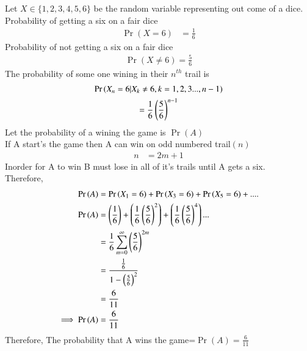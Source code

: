 Let $X\in\{1,2,3,4,5,6\}$ be the random variable representing out come of a dice.\\
Probability of getting a six on a fair dice
\begin{align}
\Pr(X=6) &=\frac{1}{6}
\end{align}
Probability of not getting a six on a fair dice
\begin{align}
\Pr(X\neq6)=\frac{5}{6}
\end{align}
The probability of some one wining in their $n^{th}$ trail is
    \begin{multline}
        \Pr{(X_n=6|X_k\neq6,k=1,2,3...,n-1)}\\
    =\frac{1}{6}\left(\frac{5}{6}\right)^{n-1}
    \end{multline}
Let the probability of a wining the game is $\Pr{(A)}$\\
If A start's the game then A can win on odd numbered trail$(n)$\\
\begin{align}
n&=2m+1
\end{align}
Inorder for A to win B must lose in all of it's trails until A gets a six.\\
Therefore,
\begin{align}
   \Pr{(A)}&=\Pr{(X_1=6)}+\Pr{(X_3=6)}+\Pr{(X_5=6)}+....\\
    \Pr{(A)}&=\left(\frac{1}{6}\right)+\left(\frac{1}{6}\left(\frac{5}{6}\right)^{2}\right)+\left(\frac{1}{6}\left(\frac{5}{6}\right)^{4}\right)...\\
    &=\frac{1}{6}\sum_{m=0}^{\infty}\left(\frac{5}{6}\right)^{2m}\\
    &=\frac{\frac{1}{6}}{1-\left(\frac{5}{6}\right)^2}\\
    &=\frac{6}{11}\\
    \implies \Pr{(A)}&=\frac{6}{11}
\end{align}
Therefore, The probability that A wins the game=$\Pr{(A)=\frac{6}{11}}$